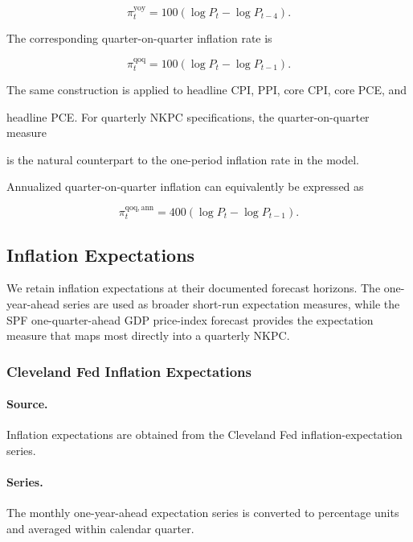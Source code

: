 \documentclass[11pt]{article}
\begin{document}
\begin{equation}
\pi_t^{\mathrm{yoy}}
=
100
\left(
\log P_t-\log P_{t-4}
\right).
\end{equation}

The corresponding quarter-on-quarter inflation rate is

\begin{equation}
\pi_t^{\mathrm{qoq}}
=
100
\left(
\log P_t-\log P_{t-1}
\right).
\end{equation}

The same construction is applied to headline CPI, PPI, core CPI, core PCE, and

headline PCE. For quarterly NKPC specifications, the quarter-on-quarter measure

is the natural counterpart to the one-period inflation rate in the model.

Annualized quarter-on-quarter inflation can equivalently be expressed as

\begin{equation}
\pi_t^{\mathrm{qoq,ann}}
=
400
\left(
\log P_t-\log P_{t-1}
\right).
\end{equation}



\subsection{Inflation Expectations}

We retain inflation expectations at their documented forecast horizons. The
one-year-ahead series are used as broader short-run expectation measures, while
the SPF one-quarter-ahead GDP price-index forecast provides the expectation
measure that maps most directly into a quarterly NKPC.

\subsubsection{Cleveland Fed Inflation Expectations}

\paragraph{Source.}
Inflation expectations are obtained from the Cleveland Fed inflation-expectation
series.

\paragraph{Series.}
The monthly one-year-ahead expectation series is converted to percentage units
and averaged within calendar quarter.
\end{document}
